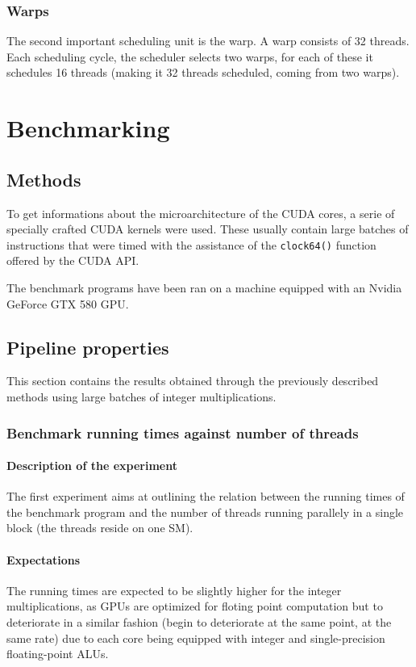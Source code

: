 \documentclass{report}
\begin{document}
        \subsection{Warps}
        The second important scheduling unit is the warp. A warp consists
        of 32 threads. Each scheduling cycle, the scheduler selects two
        warps, for each of these it schedules 16 threads (making it 32
        threads scheduled, coming from two warps).

\chapter{Benchmarking}

\section{Methods}
	To get informations about the microarchitecture of the CUDA cores, a serie 
    of specially crafted CUDA kernels were used. These usually contain large 
    batches of instructions that were timed with the assistance of the \texttt{clock64()} 
    function offered by the CUDA API.

	The benchmark programs have been ran on a machine equipped with an Nvidia
    GeForce GTX 580 GPU.

\section{Pipeline properties}
	This section contains the results obtained through the previously described
	methods using large batches of integer multiplications.

	\subsection{Benchmark running times against number of threads}
	\label{par:pipeline_exp}
	\subsubsection{Description of the experiment}
	The first experiment aims at outlining the relation between the running
    times of the benchmark program and the number of threads running parallely in
    a single block (the threads reside on one SM).
	\subsubsection{Expectations}
    The running times are expected to be slightly higher for the integer
    multiplications, as GPUs are optimized for floting point computation
    but to deteriorate in a similar fashion (begin to deteriorate
    at the same point, at the same rate) due to each core being equipped with
    integer and single-precision floating-point ALUs.
    
\end{document}
